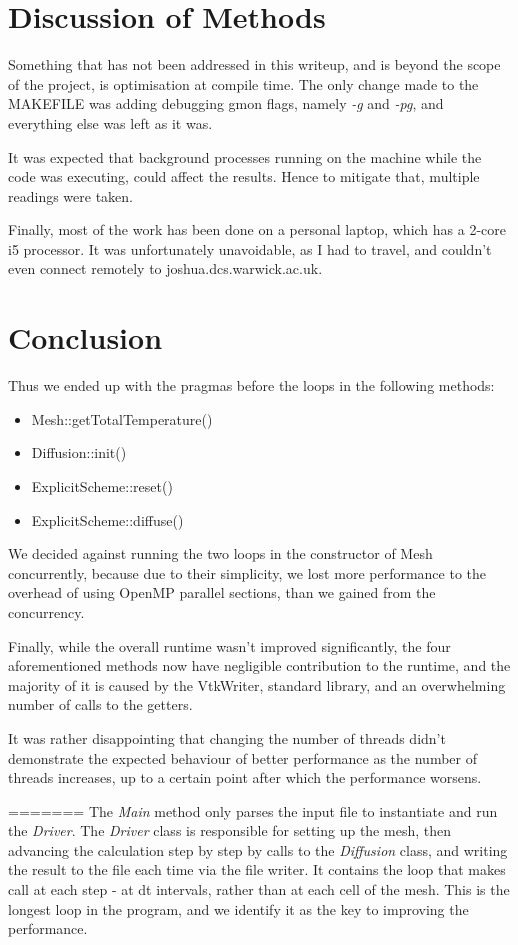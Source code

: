 \documentclass[11pt,journal]{IEEEtran}
\begin{document}
	\section{Discussion of Methods}
	Something that has not been addressed in this writeup, and is beyond the scope of the project, is optimisation at compile time. The only change made to the MAKEFILE was adding debugging gmon flags, namely \emph{-g} and \emph{-pg}, and everything else was left as it was.
	
	It was expected that background processes running on the machine while the code was executing, could affect the results. Hence to mitigate that, multiple readings were taken.
	
	Finally, most of the work has been done on a personal laptop, which has a 2-core i5 processor. It was unfortunately unavoidable, as I had to travel, and couldn't even connect remotely to joshua.dcs.warwick.ac.uk.
	
	
	\section{Conclusion}
	Thus we ended up with the pragmas before the loops in the following methods:
	\begin{itemize}
		\item Mesh::getTotalTemperature()
		\item Diffusion::init()
		\item ExplicitScheme::reset()
		\item ExplicitScheme::diffuse()
	\end{itemize}

	We decided against running the two loops in the constructor of Mesh concurrently, because due to their simplicity, we lost more performance to the overhead of using OpenMP parallel sections, than we gained from the concurrency.
	
	Finally, while the overall runtime wasn't improved significantly, the four aforementioned methods now have negligible contribution to the runtime, and the majority of it is caused by the VtkWriter, standard library, and an overwhelming number of calls to the getters.
	
	It was rather disappointing that changing the number of threads didn't demonstrate the expected behaviour of better performance as the number of threads increases, up to a certain point after which the performance worsens.
	
	
	
=======
	The \emph{Main} method only parses the input file to instantiate and run the \emph{Driver}. The \emph{Driver} class is responsible for setting up the mesh, then advancing the calculation step by step by calls to the \emph{Diffusion} class, and writing the result to the file each time via the file writer. It contains the loop that makes call at each step - at dt intervals, rather than at each cell of the mesh. This is the longest loop in the program, and we identify it as the key to improving the performance.
	
\end{document}
